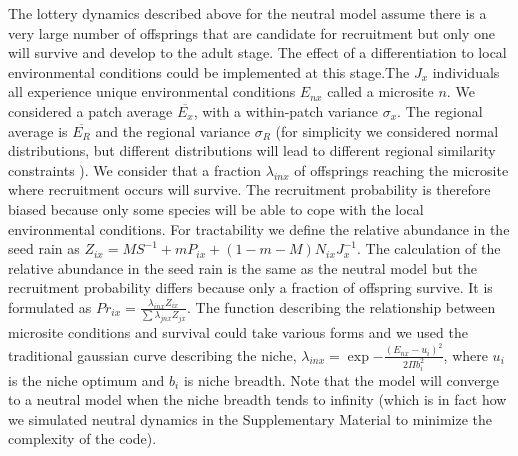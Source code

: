 \documentclass[12pt]{article}
\begin{document}
The lottery dynamics described above for the neutral model assume there is a
very large number of offsprings that are candidate for recruitment but only one
will survive and develop to the adult stage. The effect of a differentiation to
local environmental conditions could be implemented at this stage.The $J_x$
individuals all experience unique environmental conditions $E_{nx}$ called a
microsite $n$. We considered a patch average $\overline{E_x}$, with a
within-patch variance $\sigma_x$. The regional average is $\overline{E_R}$ and
the regional variance $\sigma_R$ (for simplicity we considered normal
distributions, but different distributions will lead to different regional
similarity constraints \parencite{Mouquet2003,Tilman2004,Gravel2006}). We
consider that a fraction $\lambda_{inx}$ of offsprings reaching the microsite
where recruitment occurs will survive. The recruitment probability is therefore
biased because only some species will be able to cope with the local
environmental conditions. For tractability we define the relative abundance in
the seed rain as $Z_{ix} = MS^{-1} + mP_{ix} + (1-m-M)N_{ix}J_x^{-1}$. The
calculation of the relative abundance in the seed rain is the same as the
neutral model but the recruitment probability differs because only a fraction of
offspring survive. It is formulated as $Pr_{ix} =
\frac{\lambda_{inx}Z_{ix}}{\sum \lambda_{jnx}Z_{jx}}$. The function describing
the relationship between microsite conditions and survival could take various
forms and we used the traditional gaussian curve describing the niche,
$\lambda_{inx} =  \exp{-\frac{(E_{nx}-u_i)^2}{2\Pi b_i^2}}$, where $u_i$ is the
niche optimum and $b_i$ is niche breadth. Note that the model will converge to a
neutral model when the niche breadth tends to infinity (which is in fact how we
simulated neutral dynamics in the Supplementary Material to minimize the
complexity of the code). 
\end{document}
